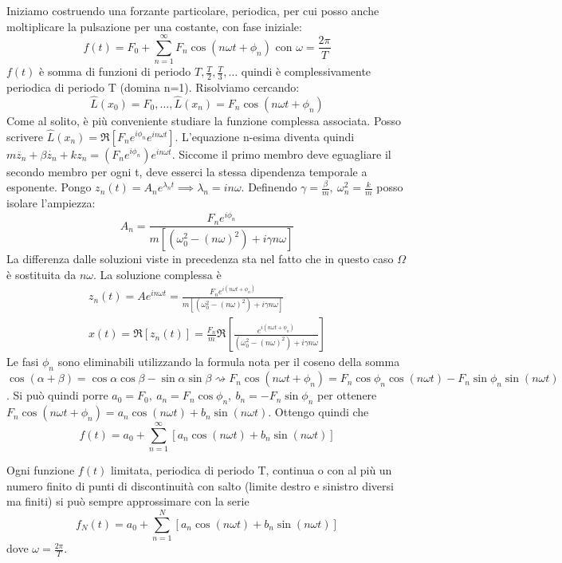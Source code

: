 Iniziamo costruendo una forzante particolare, periodica, per cui posso anche moltiplicare la pulsazione per una costante, con fase iniziale:
\[
	f(t) = F_0 + \sum_{n=1}^{\infty} F_n \cos (n \omega t + \phi _n) \text{ con } \omega = \frac{2\pi }{T} 
\]
\(f(t)\) è somma di funzioni di periodo \(T, \frac{T}{2}, \frac{T}{3}, \dots \) quindi è complessivamente periodica di periodo T (domina n=1). Risolviamo cercando:
\[
	\hat{L} (x_0)=F_0, \dots , \hat{L} (x_n)= F_n \cos (n \omega t + \phi _n)
\]
Come al solito, è più conveniente studiare la funzione complessa associata. Posso scrivere \(\hat{L} (x_n)=\Re [F_n e^{i \phi _n}e^{in \omega t} ]\). L'equazione n-esima diventa quindi \(m \ddot{z_n} + \beta \dot{z_n} + k z_n = (F_n e^{i \phi _n})e^{in \omega t}\). Siccome il primo membro deve eguagliare il secondo membro per ogni t, deve esserci la stessa dipendenza temporale a esponente. Pongo \(z_n(t)=A_n e^{\lambda _n t} \implies \lambda _n = in \omega \). Definendo \(\gamma =\frac{\beta }{m},\ \omega _n ^{2} = \frac{k}{m}\) posso isolare l'ampiezza:
\[
	A_n = \frac{F_n e^{i \phi _n}}{m [(\omega _0 ^{2} -(n \omega )^{2} ) + i \gamma n \omega ]}
\]
La differenza dalle soluzioni viste in precedenza sta nel fatto che in questo caso \(\Omega \) è sostituita da \(n \omega \). La soluzione complessa è
\begin{gather*}
	z_n(t) = A e^{in \omega t}= \frac{F_n e^{i(n \omega t + \phi _n)}}{m [(\omega _0 ^{2} -(n \omega )^{2} )+i \gamma n \omega ]}\\
	x(t)= \Re [z_n(t)]= \frac{F_n}{m}\Re \left[\frac{e^{i(n \omega t + \phi _n)}}{(\omega _0 ^{2} - (n \omega )^{2} )+i \gamma n \omega }\right] 
\end{gather*}
Le fasi \(\phi _n \) sono eliminabili utilizzando la formula nota per il coseno della somma\(\cos (\alpha +\beta )=\cos \alpha \cos \beta -\sin \alpha \sin \beta \rightsquigarrow F_n \cos (n \omega t + \phi _n) = F_n \cos \phi _n \cos (n \omega t) - F_n \sin \phi _n \sin (n \omega t) \). Si può quindi porre \(a_0 =F_0,\ a_n = F_n \cos \phi _n,\ b_n =-F_n \sin \phi _n\) per ottenere \(F_n \cos (n \omega t + \phi _n) = a_n \cos (n \omega t) + b_n \sin (n \omega t)\).
Ottengo quindi che
\[
	f(t) = a_0 + \sum_{n=1}^{\infty} [a_n \cos (n \omega t) + b_n \sin (n \omega t)]
\]

\begin{theorem}
	Ogni funzione \(f(t)\) limitata, periodica di periodo T, continua o con al più un numero finito di punti di discontinuità con salto (limite destro e sinistro diversi ma finiti) si può sempre approssimare con la serie
	\[
		f_N(t)=a_0 + \sum_{n=1}^{N } [a_n \cos (n \omega t) + b_n \sin (n \omega t)] 
	\]
	dove \(\omega = \frac{2\pi }{T}\).
\end{theorem}

